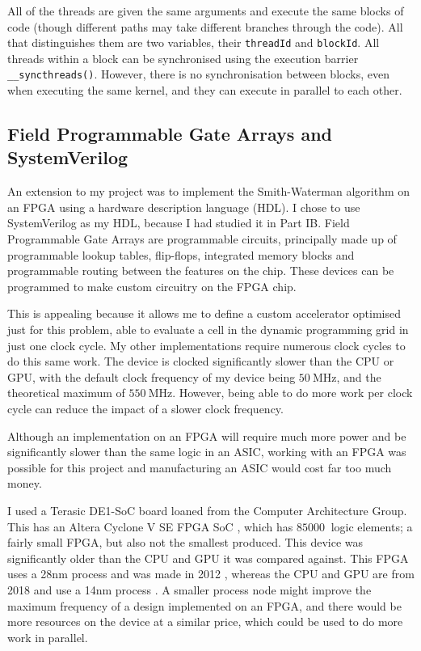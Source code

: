 All of the threads are given the same arguments and execute the same blocks of code (though different paths may take different branches through the code).
All that distinguishes them are two variables, their \lstinline{threadId} and \lstinline{blockId}.
All threads within a block can be synchronised using the execution barrier \lstinline{__syncthreads()}.
However, there is no synchronisation between blocks, even when executing the same kernel, and they can execute in parallel to each other.

\subsection{Field Programmable Gate Arrays and SystemVerilog}
\label{sec:FPGA_prep}
An extension to my project was to implement the Smith-Waterman algorithm on an FPGA using a hardware description language (HDL).
I chose to use SystemVerilog as my HDL, because I had studied it in Part IB.
Field Programmable Gate Arrays are programmable circuits, principally made up of programmable lookup tables, flip-flops, integrated memory blocks and programmable routing between the features on the chip.
These devices can be programmed to make custom circuitry on the FPGA chip.

This is appealing because it allows me to define a custom accelerator optimised just for this problem, able to evaluate a cell in the dynamic programming grid in just one clock cycle.
My other implementations require numerous clock cycles to do this same work.
The device is clocked significantly slower than the CPU or GPU, with the default clock frequency of my device being $\SI{50}{\mega\hertz}$, and the theoretical maximum of $\SI{550}{\mega\hertz}$.
However, being able to do more work per clock cycle can reduce the impact of a slower clock frequency.

Although an implementation on an FPGA will require much more power and be significantly slower than the same logic in an ASIC, working with an FPGA was possible for this project and manufacturing an ASIC would cost far too much money.

I used a Terasic DE1-SoC board \cite{DE1-SoC} loaned from the Computer Architecture Group.
This has an Altera Cyclone V SE FPGA SoC \cite{CycloneV}, which has $\SI{85000}{}$ logic elements; a fairly small FPGA, but also not the smallest produced. This device was significantly older than the CPU and GPU it was compared against. This FPGA uses a 28nm process and was made in 2012 \cite{CycloneV}, whereas the CPU and GPU are from 2018 and use a 14nm process \cite{i7-8750H} \cite{1050-Ti}.
A smaller process node might improve the maximum frequency of a design implemented on an FPGA, and there would be more resources on the device at a similar price, which could be used to do more work in parallel.

